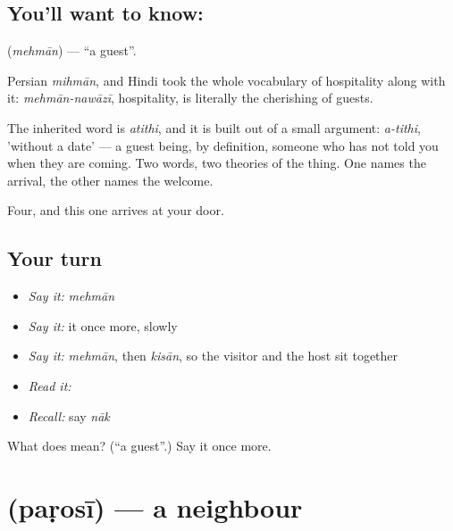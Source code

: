\subsection*{You'll want to know: }
\textbf{} (\emph{mehmān}) — \textquotedblleft{}a guest\textquotedblright{}.

Persian \emph{mihmān}, and Hindi took the whole vocabulary of hospitality along with it: \emph{mehmān-nawāzī}, hospitality, is literally the cherishing of guests.

The inherited word is \emph{atithi}, and it is built out of a small argument: \emph{a-tithi}, 'without a date' — a guest being, by definition, someone who has not told you when they are coming. Two words, two theories of the thing. One names the arrival, the other names the welcome.

\begin{grammarlens}[title={What you've built}]
Four, and this one arrives at your door.
\end{grammarlens}

\subsection*{Your turn}
\begin{itemize}
\raggedright
  \item \emph{Say it:} \emph{mehmān}
  \item \emph{Say it:} it once more, slowly
  \item \emph{Say it:} \emph{mehmān}, then \emph{kisān}, so the visitor and the host sit together
  \item \emph{Read it:} \textbf{}
  \item \emph{Recall:} say \emph{nāk}
\end{itemize}

\begin{tcolorbox}[breakable,colback=teal!4,colframe=teal!35!black,title={Before you move on}]
What does  mean? (\textquotedblleft{}a guest\textquotedblright{}.) Say it once more.
\end{tcolorbox}
\section[\texorpdfstring{\hi{पड़ोसी} (paṛosī)}{पड़ोसी (paṛosī)}]{ (paṛosī) — a neighbour}

\label{lesson:HI-C47-neighbour}



